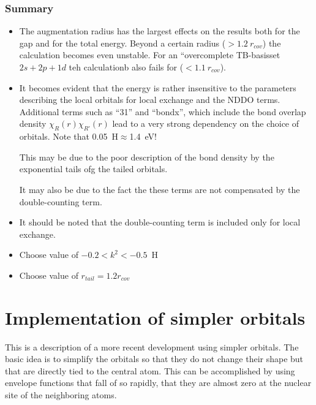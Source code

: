 \documentclass[11pt,a4paper]{report}
\begin{document}
\subsection{Summary}
\begin{itemize}
\item The augmentation radius has the largest effects on the results
  both for the gap and for the total energy. Beyond a certain radius
  ($>1.2~r_{cov}$) the calculation becomes even unstable. For an
  ``overcomplete TB-basisset $2s+2p+1d$ teh calculationb also fails for
  ($<1.1~r_{cov}$).
%
\item It becomes evident that the energy is rather insensitive to the
  parameters describing the local orbitals for local exchange and the
  NDDO terms. Additional terms such as ``31'' and ``bondx'', which
  include the bond overlap density $\chi_R(r)\chi_{R'}(r)$ lead to a
  very strong dependency on the choice of orbitals. Note that
  0.05~H$\approx$1.4~eV!

  This may be due to the poor description of the bond density by the
  exponential tails ofg the tailed orbitals.

  It may also be due to the fact the these terms are not compensated
  by the double-counting term.
% 
\item It should be noted that the double-counting term is included
  only for local exchange.
%
\item Choose value of $-0.2<k^2<-0.5$~H 
%
\item Choose value of $r_{tail}=1.2 r_{cov}$
\end{itemize}


\chapter{Implementation of simpler orbitals}
This is a description of a more recent development using simpler
orbitals. The basic idea is to simplify the orbitals so that they do
not change their shape but that are directly tied to the central
atom. This can be accomplished by using envelope functions that fall
of so rapidly, that they are almost zero at the nuclear site of the
neighboring atoms.


\end{document}
